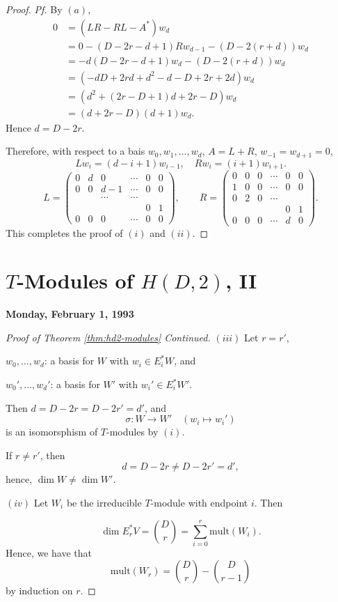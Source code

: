 \documentclass[
]{book}
\theoremstyle{definition}
\theoremstyle{definition}
\theoremstyle{definition}
\theoremstyle{definition}
\theoremstyle{remark}
\begin{document}
\begin{proof}
\emph{Pf.}
By \((a)\),
\begin{align}
0 & = (LR - RL - A^*)w_d \\
& = 0 - (D-2r-d+1)Rw_{d-1} - (D-2(r+d))w_d\\
& = -d(D-2r-d+1)w_d - (D-2(r+d))w_d\\
& = (-dD + 2rd + d^2 - d - D + 2r + 2d)w_d\\
& = (d^2 + (2r-D+1)d + 2r - D)w_d\\
& = (d+2r-D)(d+1)w_d.
\end{align}
Hence \(d = D-2r\).

Therefore, with respect to a bais \(w_0, w_1, \ldots, w_d\),
\(A = L+R\), \(w_{-1} = w_{d+1} = 0\),
\[Lw_i = (d-i+1)w_{i-1}, \quad Rw_i = (i+1)w_{i+1}.\]
\[L = \begin{pmatrix} 0 & d & 0 & \cdots & 0 & 0\\
0 & 0 & d-1 & \cdots & 0 & 0\\
& & \cdots & \cdots & & \\
& & & & 0 & 1\\
0 & 0 & 0 & \cdots & 0 & 0
\end{pmatrix}, \qquad 
R = \begin{pmatrix} 0 & 0 & 0 & \cdots & 0 & 0\\
1 & 0 & 0 & \cdots & 0 & 0\\
0 & 2 & 0 & \cdots & & \\
& & & & 0 & 1\\
0 & 0 & 0 & \cdots & d & 0
\end{pmatrix}.\]
This completes the proof of \((i)\) and \((ii)\).
\end{proof}

\hypertarget{lec6}{%
\chapter{\texorpdfstring{\(T\)-Modules of \(H(D,2)\), II}{T-Modules of H(D,2), II}}\label{lec6}}

\textbf{Monday, February 1, 1993}

\begin{proof}[Proof of Theorem \ref{thm:hd2-modules} Continued]
\leavevmode

\((iii)\) Let \(r = r'\),

\(w_0,\ldots, w_d\): a basis for \(W\) with \(w_i\in E^*_iW\), and

\(w_0', \ldots, w_d'\): a basis for \(W'\) with \(w_i'\in E^*_iW'\).

Then \(d = D-2r = D-2r' = d'\), and
\[\sigma: W \to W' \quad (w_i\mapsto w_i')\]
is an isomorsphism of \(T\)-modules by \((i)\).

If \(r\neq r'\), then
\[d = D-2r \neq D-2r' = d',\]
hence, \(\dim W \neq \dim W'\).

\((iv)\) Let \(W_i\) be the irreducible \(T\)-module with endpoint \(i\). Then

\[\dim E_r^*V = \binom{D}{r} = \sum_{i=0}^r \mathrm{mult}(W_i).\]
Hence, we have that
\[\mathrm{mult}(W_r) = \binom{D}{r} - \binom{D}{r-1}\]
by induction on \(r\).

\end{proof}
\end{document}
